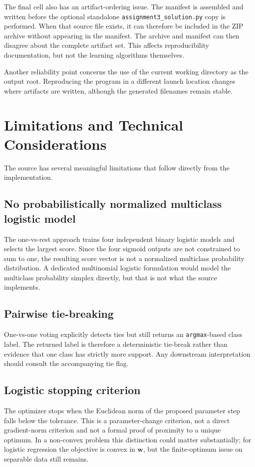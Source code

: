 \documentclass[11pt,a4paper]{article}
\newcommand{\code}[1]{\texttt{#1}}
\begin{document}
The final cell also has an artifact-ordering issue. The manifest is assembled and written before the optional standalone \code{assignment3\_solution.py} copy is performed. When that source file exists, it can therefore be included in the ZIP archive without appearing in the manifest. The archive and manifest can then disagree about the complete artifact set. This affects reproducibility documentation, but not the learning algorithms themselves.

Another reliability point concerns the use of the current working directory as the output root. Reproducing the program in a different launch location changes where artifacts are written, although the generated filenames remain stable.

\section{Limitations and Technical Considerations}
The source has several meaningful limitations that follow directly from the implementation.

\subsection{No probabilistically normalized multiclass logistic model}
The one-vs-rest approach trains four independent binary logistic models and selects the largest score. Since the four sigmoid outputs are not constrained to sum to one, the resulting score vector is not a normalized multiclass probability distribution. A dedicated multinomial logistic formulation would model the multiclass probability simplex directly, but that is not what the source implements.

\subsection{Pairwise tie-breaking}
One-vs-one voting explicitly detects ties but still returns an \code{argmax}-based class label. The returned label is therefore a deterministic tie-break rather than evidence that one class has strictly more support. Any downstream interpretation should consult the accompanying tie flag.

\subsection{Logistic stopping criterion}
The optimizer stops when the Euclidean norm of the proposed parameter step falls below the tolerance. This is a parameter-change criterion, not a direct gradient-norm criterion and not a formal proof of proximity to a unique optimum. In a non-convex problem this distinction could matter substantially; for logistic regression the objective is convex in \(\mathbf{w}\), but the finite-optimum issue on separable data still remains.
\end{document}

